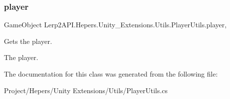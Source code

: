\subsubsection{\texorpdfstring{player}{player}}
{\footnotesize\ttfamily Game\+Object Lerp2\+A\+P\+I.\+Hepers.\+Unity\+\_\+\+Extensions.\+Utils.\+Player\+Utils.\+player\hspace{0.3cm}{\ttfamily [static]}, {\ttfamily [get]}}



Gets the player. 

The player.

The documentation for this class was generated from the following file\+:\begin{DoxyCompactItemize}
\item 
Project/\+Hepers/\+Unity Extensions/\+Utils/Player\+Utils.\+cs\end{DoxyCompactItemize}
